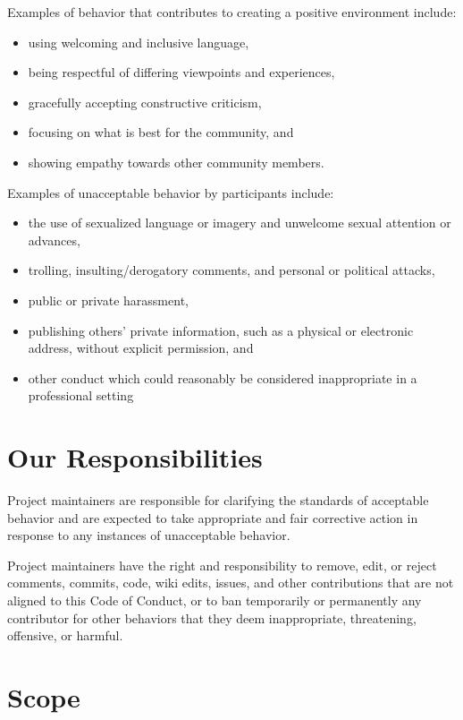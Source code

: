 Examples of behavior that contributes to creating a positive
environment include:

\begin{itemize}
\tightlist
\item
  using welcoming and inclusive language,
\item
  being respectful of differing viewpoints and experiences,
\item
  gracefully accepting constructive criticism,
\item
  focusing on what is best for the community, and
\item
  showing empathy towards other community members.
\end{itemize}

Examples of unacceptable behavior by participants include:

\begin{itemize}
\tightlist
\item
  the use of sexualized language or imagery and unwelcome sexual
  attention or advances,
\item
  trolling, insulting/derogatory comments, and personal or political
  attacks,
\item
  public or private harassment,
\item
  publishing others' private information, such as a physical or
  electronic address, without explicit permission, and
\item
  other conduct which could reasonably be considered inappropriate in
  a professional setting
\end{itemize}

\section{Our Responsibilities}\label{our-responsibilities}

Project maintainers are responsible for clarifying the standards of
acceptable behavior and are expected to take appropriate and fair
corrective action in response to any instances of unacceptable
behavior.

Project maintainers have the right and responsibility to remove, edit,
or reject comments, commits, code, wiki edits, issues, and other
contributions that are not aligned to this Code of Conduct, or to ban
temporarily or permanently any contributor for other behaviors that
they deem inappropriate, threatening, offensive, or harmful.

\section{Scope}\label{scope}

